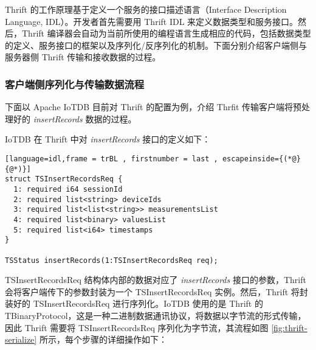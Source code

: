 Thrift 的工作原理基于定义一个服务的接口描述语言（Interface Description Language, IDL）。开发者首先需要用 Thrift IDL 来定义数据类型和服务接口。然后，Thrift 编译器会自动为当前所使用的编程语言生成相应的代码，包括数据类型的定义、服务接口的框架以及序列化/反序列化的机制。下面分别介绍客户端侧与服务器侧 Thrift 传输和接收数据的过程。
\subsubsection{客户端侧序列化与传输数据流程}
下面以 Apache IoTDB 目前对 Thrift 的配置为例，介绍 Thrfit 传输客户端将预处理好的 \emph{insertRecords} 数据的过程。

IoTDB 在 Thrift 中对 \emph{insertRecords} 接口的定义如下：
\begin{lstlisting}[language=idl,frame = trBL , firstnumber = last , escapeinside={(*@}{@*)}]
struct TSInsertRecordsReq {
  1: required i64 sessionId
  2: required list<string> deviceIds
  3: required list<list<string>> measurementsList
  4: required list<binary> valuesList
  5: required list<i64> timestamps
}

TSStatus insertRecords(1:TSInsertRecordsReq req);
\end{lstlisting}
TSInsertRecordsReq 结构体内部的数据对应了 \emph{insertRecords} 接口的参数，Thrift 会将客户端传下的参数封装为一个 TSInsertRecordsReq 实例。然后，Thrift 将封装好的 TSInsertRecordsReq 进行序列化。IoTDB 使用的是 Thrift 的 TBinaryProtocol，这是一种二进制数据通讯协议，将数据以字节流的形式传输，因此 Thrift 需要将 TSInsertRecordsReq 序列化为字节流，其流程如图 \ref{fig:thrift-serialize} 所示，每个步骤的详细操作如下：
